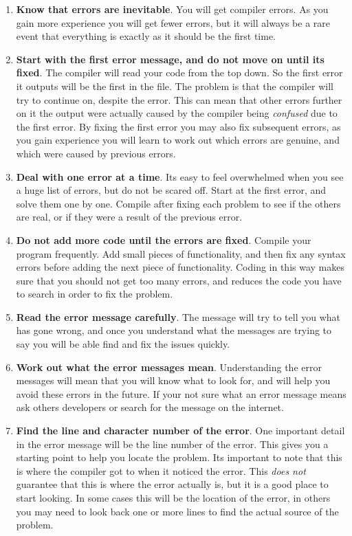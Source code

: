 \begin{enumerate}
  \item \textbf{Know that errors are inevitable}. You will get compiler errors. As you gain more experience you will get fewer errors, but it will always be a rare event that everything is exactly as it should be the first time.
  \item \textbf{Start with the first error message, and do not move on until its fixed}. The compiler will read your code from the top down. So the first error it outputs will be the first in the file. The problem is that the compiler will try to continue on, despite the error. This can mean that other errors further on it the output were actually caused by the compiler being \emph{confused} due to the first error. By fixing the first error you may also fix subsequent errors, as you gain experience you will learn to work out which errors are genuine, and which were caused by previous errors.
  \item \textbf{Deal with one error at a time}. Its easy to feel overwhelmed when you see a huge list of errors, but do not be scared off. Start at the first error, and solve them one by one. Compile after fixing each problem to see if the others are real, or if they were a result of the previous error.
  \item \textbf{Do not add more code until the errors are fixed}. Compile your program frequently. Add small pieces of functionality, and then fix any syntax errors before adding the next piece of functionality. Coding in this way makes sure that you should not get too many errors, and reduces the code you have to search in order to fix the problem.
  \item \textbf{Read the error message carefully}. The message will try to tell you what has gone wrong, and once you understand what the messages are trying to say you will be able find and fix the issues quickly.
  \item  \textbf{Work out what the error messages mean}. Understanding the error messages will mean that you will know what to look for, and will help you avoid these errors in the future. If your not sure what an error message means ask others developers or search for the message on the internet.
  \item \textbf{Find the line and character number of the error}. One important detail in the error message will be the line number of the error. This gives you a starting point to help you locate the problem. Its important to note that this is where the compiler got to when it noticed the error. This \emph{does not} guarantee that this is where the error actually is, but it is a good place to start looking. In some cases this will be the location of the error, in others you may need to look back one or more lines to find the actual source of the problem.

\end{enumerate}
